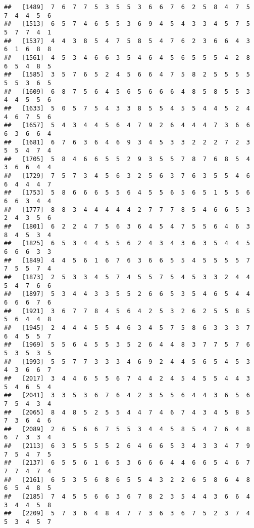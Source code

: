 \documentclass[
]{book}
\begin{document}
\begin{verbatim}
##   [1489]  7  6  7  7  5  3  5  5  3  6  6  7  6  2  5  8  4  7  5  7  4  4  5  6
##   [1513]  6  5  7  4  6  5  5  3  6  9  4  5  4  3  3  4  5  7  5  5  7  7  4  1
##   [1537]  4  4  3  8  5  4  7  5  8  5  4  7  6  2  3  6  6  4  3  6  1  6  8  8
##   [1561]  4  5  3  4  6  6  3  5  4  6  4  5  6  5  5  5  4  2  8  6  5  4  8  5
##   [1585]  3  5  7  6  5  2  4  5  6  6  4  7  5  8  2  5  5  5  5  5  5  3  6  5
##   [1609]  6  8  7  5  6  4  5  6  5  6  6  6  4  8  5  8  5  5  3  4  4  5  5  6
##   [1633]  5  0  5  7  5  4  3  3  8  5  5  4  5  5  4  4  5  2  4  4  6  7  5  6
##   [1657]  5  4  3  4  4  5  6  4  7  9  2  6  4  4  4  7  3  6  6  6  3  6  6  4
##   [1681]  6  7  6  3  6  4  6  9  3  4  5  3  3  2  2  2  7  2  3  5  5  4  7  4
##   [1705]  5  8  4  6  6  5  5  2  9  3  5  5  7  8  7  6  8  5  4  3  6  6  4  4
##   [1729]  7  5  7  3  4  5  6  3  2  5  6  3  7  6  3  5  5  4  6  6  4  4  4  7
##   [1753]  5  8  6  6  6  5  5  6  4  5  5  6  5  6  5  1  5  5  6  6  6  3  4  4
##   [1777]  8  8  3  4  4  4  4  4  2  7  7  7  8  5  4  6  6  5  3  2  4  3  5  6
##   [1801]  6  2  2  4  7  5  6  3  6  4  5  4  7  5  5  6  4  6  3  8  4  5  3  4
##   [1825]  6  5  3  4  4  5  5  6  2  4  3  4  3  6  3  5  4  4  5  6  6  6  3  3
##   [1849]  4  4  5  6  1  6  7  6  3  6  6  5  5  4  5  5  5  5  7  7  5  5  7  4
##   [1873]  2  5  3  3  4  5  7  4  5  5  7  5  4  5  3  3  2  4  4  5  4  7  6  6
##   [1897]  5  3  4  4  3  3  5  5  2  6  6  5  3  5  4  6  5  4  4  6  6  6  7  6
##   [1921]  3  6  7  7  8  4  5  6  4  2  5  3  2  6  2  5  5  8  5  5  6  4  4  8
##   [1945]  2  4  4  4  5  5  4  6  3  4  5  7  5  8  6  3  3  3  7  6  4  5  5  7
##   [1969]  5  5  6  4  5  5  3  5  2  6  4  4  8  3  7  7  5  7  6  5  3  5  3  5
##   [1993]  5  5  7  7  3  3  3  4  6  9  2  4  4  5  6  5  4  5  3  4  3  6  6  7
##   [2017]  3  4  4  6  5  5  6  7  4  4  2  4  5  4  5  5  4  4  3  5  4  6  5  4
##   [2041]  3  3  5  3  6  7  6  4  2  3  5  5  6  4  4  3  6  5  6  7  5  4  3  4
##   [2065]  8  4  8  5  2  5  5  4  4  7  4  6  7  4  3  4  5  8  5  7  3  6  4  6
##   [2089]  2  6  5  6  6  7  5  5  3  4  4  5  8  5  4  7  6  4  8  6  7  3  3  4
##   [2113]  6  3  5  5  5  5  2  6  4  6  6  5  3  4  3  3  4  7  9  7  5  4  7  5
##   [2137]  6  5  5  6  1  6  5  3  6  6  6  4  4  6  6  5  4  6  7  7  7  4  7  4
##   [2161]  6  5  3  5  6  8  6  5  5  4  3  2  2  6  5  8  6  4  8  6  5  4  8  5
##   [2185]  7  4  5  5  6  6  3  6  7  8  2  3  5  4  4  3  6  6  4  3  4  4  5  8
##   [2209]  5  7  3  6  4  8  4  7  7  3  6  3  6  7  5  2  3  7  4  5  3  4  5  7

\end{verbatim}
\end{document}
